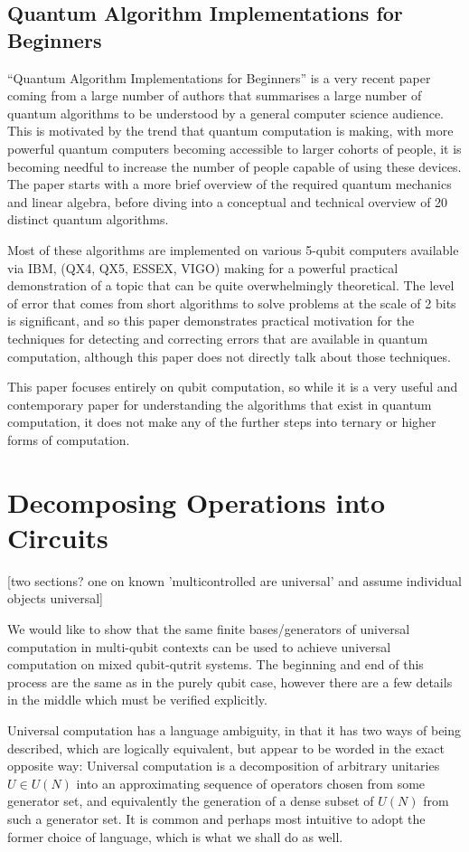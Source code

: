 \documentclass[]{article}
\begin{document}
\subsection{Quantum Algorithm Implementations for Beginners}
``Quantum Algorithm Implementations for Beginners''\cite{algos} is a very recent paper coming from a large number of authors that summarises a large number of quantum algorithms to be understood by a general computer science audience. This is motivated by the trend that quantum computation is making, with more powerful quantum computers becoming accessible to larger cohorts of people, it is becoming needful to increase the number of people capable of using these devices. The paper starts with a more brief overview of the required quantum mechanics and linear algebra, before diving into a conceptual and technical overview of 20 distinct quantum algorithms.

Most of these algorithms are implemented on various 5-qubit computers available via IBM, (QX4, QX5, ESSEX, VIGO) making for a powerful practical demonstration of a topic that can be quite overwhelmingly theoretical. The level of error that comes from short algorithms to solve problems at the scale of 2 bits is significant, and so this paper demonstrates practical motivation for the techniques for detecting and correcting errors that are available in quantum computation, although this paper does not directly talk about those techniques.

This paper focuses entirely on qubit computation, so while it is a very useful and contemporary paper for understanding the algorithms that exist in quantum computation, it does not make any of the further steps into ternary or higher forms of computation.

\section{Decomposing Operations into Circuits}
[two sections? one on known 'multicontrolled are universal' and assume individual objects universal]

We would like to show that the same finite bases/generators of universal computation in multi-qubit contexts can be used to achieve universal computation on mixed qubit-qutrit systems. The beginning and end of this process are the same as in the purely qubit case, however there are a few details in the middle which  must be verified explicitly.

Universal computation has a language ambiguity, in that it has two ways of being described, which are logically equivalent, but appear to be worded in the exact opposite way: Universal computation is a decomposition of arbitrary unitaries $U \in U(N)$ into an approximating sequence of operators chosen from some generator set, and equivalently the generation of a dense subset of $U(N)$ from such a generator set. It is common and perhaps most intuitive to adopt the former choice of language, which is what we shall do as well.
\end{document}
